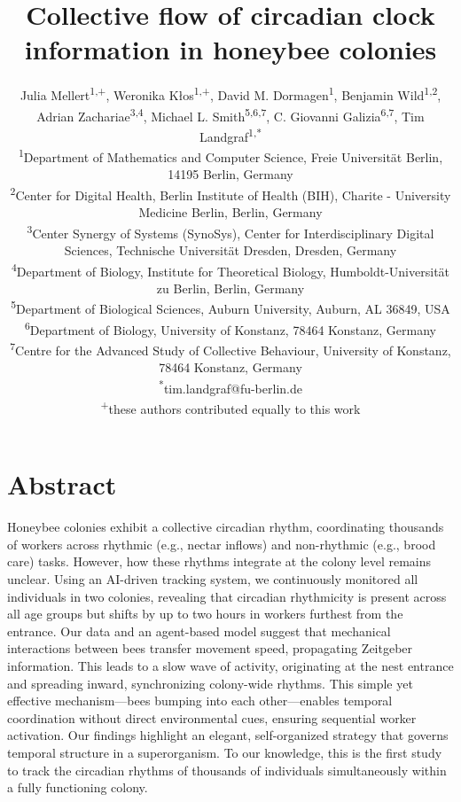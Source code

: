 \documentclass{article}
\title{Collective flow of circadian clock information in honeybee colonies}
\author{
  Julia Mellert\textsuperscript{1,+}, 
  Weronika Kłos\textsuperscript{1,+}, 
  David M. Dormagen\textsuperscript{1}, 
  Benjamin Wild\textsuperscript{1,2}, 
  Adrian Zachariae\textsuperscript{3,4}, 
  Michael L. Smith\textsuperscript{5,6,7}, 
  C. Giovanni Galizia\textsuperscript{6,7}, 
  Tim Landgraf\textsuperscript{1,*}
  \\ \vspace{1em}
  \small \textsuperscript{1}Department of Mathematics and Computer Science, Freie Universität Berlin, 14195 Berlin, Germany\\
  \small \textsuperscript{2}Center for Digital Health, Berlin Institute of Health (BIH), Charite - University Medicine Berlin, Berlin, Germany\\
  \small \textsuperscript{3}Center Synergy of Systems (SynoSys), Center for Interdisciplinary Digital Sciences, Technische Universität Dresden, Dresden, Germany\\
  \small \textsuperscript{4}Department of Biology, Institute for Theoretical Biology, Humboldt-Universität zu Berlin, Berlin, Germany\\
  \small \textsuperscript{5}Department of Biological Sciences, Auburn University, Auburn, AL 36849, USA\\
  \small \textsuperscript{6}Department of Biology, University of Konstanz, 78464 Konstanz, Germany\\
  \small \textsuperscript{7}Centre for the Advanced Study of Collective Behaviour, University of Konstanz, 78464 Konstanz, Germany\\
  \small \textsuperscript{*}tim.landgraf@fu-berlin.de\\
  \small \textsuperscript{+}these authors contributed equally to this work
}
\newcommand{\added}[1]{{\color{blue}#1}}
\newcommand{\added}[1]{#1}
\begin{document}
\maketitle

\section{Abstract}

Honeybee colonies exhibit a collective circadian rhythm, coordinating thousands of workers across rhythmic (e.g., nectar inflows) and non-rhythmic (e.g., brood care) tasks. However, how these rhythms integrate at the colony level remains unclear. Using an AI-driven tracking system, we continuously monitored all individuals in two colonies, revealing that circadian rhythmicity is present across all age groups but shifts by up to two hours in workers furthest from the entrance. Our data and an agent-based model suggest that mechanical interactions between bees transfer movement speed, propagating Zeitgeber information. This leads to a slow wave of activity, originating at the nest entrance and spreading inward, synchronizing colony-wide rhythms. This simple yet effective mechanism—bees bumping into each other—enables temporal coordination without direct environmental cues, ensuring sequential worker activation. Our findings highlight an elegant, self-organized strategy that governs temporal structure in a superorganism. \added{To our knowledge, this is the first study to track the circadian rhythms of thousands of individuals simultaneously within a fully functioning colony.}
\end{document}

